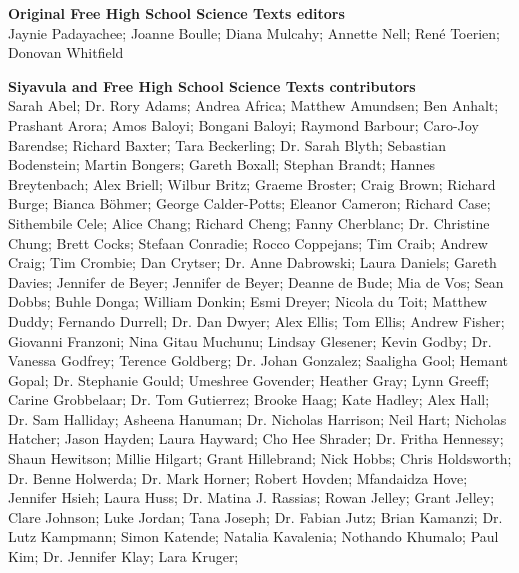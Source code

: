 \textbf{\LARGE Original Free High School Science Texts editors}\\

Jaynie Padayachee; Joanne Boulle; Diana Mulcahy; Annette Nell; René Toerien; Donovan Whitfield \par

\textbf{\LARGE Siyavula and Free High School Science Texts contributors}\\

    Sarah Abel;
Dr. Rory Adams;
    Andrea Africa;
    Matthew Amundsen;
    Ben Anhalt;
    Prashant Arora;
    Amos Baloyi;
    Bongani Baloyi;
    Raymond Barbour;
    Caro-Joy Barendse;
    Richard Baxter;
    Tara Beckerling;
Dr. Sarah Blyth;
    Sebastian Bodenstein;
    Martin Bongers;
    Gareth Boxall;
    Stephan Brandt;
    Hannes Breytenbach;
    Alex Briell;
    Wilbur Britz;
    Graeme Broster;
    Craig Brown;
    Richard Burge;
    Bianca Böhmer;
    George Calder-Potts;
    Eleanor Cameron;
    Richard Case;
    Sithembile Cele;
    Alice Chang;
    Richard Cheng;
    Fanny Cherblanc;
Dr. Christine Chung;
    Brett Cocks;
    Stefaan Conradie;
    Rocco Coppejans;
    Tim Craib;
    Andrew Craig;
    Tim Crombie;
    Dan Crytser;
Dr. Anne Dabrowski;
    Laura Daniels;
    Gareth Davies;
    Jennifer de Beyer;
    Jennifer de Beyer;
    Deanne de Bude;
    Mia de Vos;
    Sean Dobbs;
    Buhle Donga;
    William Donkin;
    Esmi Dreyer;
    Nicola du Toit;
    Matthew Duddy;
    Fernando Durrell;
Dr. Dan Dwyer;
    Alex Ellis;
    Tom Ellis;
    Andrew Fisher;
    Giovanni Franzoni;
    Nina Gitau Muchunu;
    Lindsay Glesener;
    Kevin Godby;
Dr. Vanessa Godfrey;
    Terence Goldberg;
Dr. Johan Gonzalez;
    Saaligha Gool;
    Hemant Gopal;
Dr. Stephanie Gould;
    Umeshree Govender;
    Heather Gray;
    Lynn Greeff;
    Carine Grobbelaar;
Dr. Tom Gutierrez;
    Brooke Haag;
    Kate Hadley;
    Alex Hall;
Dr. Sam Halliday;
    Asheena Hanuman;
Dr. Nicholas Harrison;
    Neil Hart;
    Nicholas Hatcher;
    Jason Hayden;
    Laura Hayward;
    Cho Hee Shrader;
Dr. Fritha Hennessy;
    Shaun Hewitson;
    Millie Hilgart;
    Grant Hillebrand;
    Nick Hobbs;
    Chris Holdsworth;
Dr. Benne Holwerda;
Dr. Mark Horner;
    Robert Hovden;
    Mfandaidza Hove;
    Jennifer Hsieh;
    Laura Huss;
Dr. Matina J. Rassias;
    Rowan Jelley;
    Grant Jelley;
    Clare Johnson;
    Luke Jordan;
    Tana Joseph;
Dr. Fabian Jutz;
    Brian Kamanzi;
Dr. Lutz Kampmann;
    Simon Katende;
    Natalia Kavalenia;
    Nothando Khumalo;
    Paul Kim;
Dr. Jennifer Klay;
    Lara Kruger;
